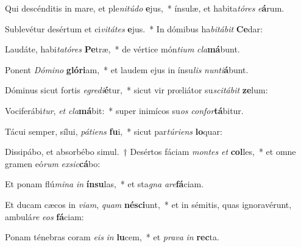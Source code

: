 \item Qui descénditis in mare, et ple\textit{ni}\textit{tú}\textit{do} \textbf{e}jus,~* ínsulæ, et habita\textit{tó}\textit{res} \textit{e}\textbf{á}rum.
\item Sublevétur desértum et ci\textit{vi}\textit{tá}\textit{tes} \textbf{e}jus.~* In dómibus ha\textit{bi}\textit{tá}\textit{bit} \textbf{Ce}dar:
\item Laudáte, habi\textit{ta}\textit{tó}\textit{res} \textbf{Pe}træ,~* de vértice món\textit{ti}\textit{um} \textit{cla}\textbf{má}bunt.
\item Ponent \textit{Dó}\textit{mi}\textit{no} \textbf{gló}\textbf{ri}am,~* et laudem ejus in ínsu\textit{lis} \textit{nun}\textit{ti}\textbf{á}bunt.
\item Dóminus sicut fortis \textit{e}\textit{gre}\textit{di}\textbf{é}tur,~* sicut vir prœliátor su\textit{sci}\textit{tá}\textit{bit} \textbf{ze}lum:
\item Vociferábi\textit{tur}, \textit{et} \textit{cla}\textbf{má}bit:~* super inimícos su\textit{os} \textit{con}\textit{for}\textbf{tá}bitur.
\item Tácui semper, sílui, \textit{pá}\textit{ti}\textit{ens} \textbf{fu}i,~* sicut par\textit{tú}\textit{ri}\textit{ens} \textbf{lo}quar:
\item Dissipábo, et absorbébo simul.~† Desértos fáciam \textit{mon}\textit{tes} \textit{et} \textbf{col}les,~* et omne gramen eó\textit{rum} \textit{ex}\textit{sic}\textbf{cá}bo:
\item Et ponam flú\textit{mi}\textit{na} \textit{in} \textbf{ín}\textbf{su}las,~* et sta\textit{gna} \textit{a}\textit{re}\textbf{fá}ciam.
\item Et ducam cæcos in \textit{vi}\textit{am}, \textit{quam} \textbf{né}\textbf{sci}unt,~* et in sémitis, quas ignoravérunt, ambulá\textit{re} \textit{e}\textit{os} \textbf{fá}ciam:
\item Ponam ténebras coram \textit{e}\textit{is} \textit{in} \textbf{lu}cem,~* et \textit{pra}\textit{va} \textit{in} \textbf{rec}ta.
